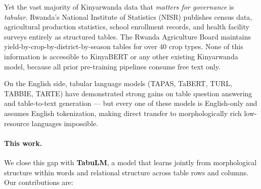 \documentclass[11pt]{article}
\begin{document}
Yet the vast majority of Kinyarwanda data that \emph{matters for governance} is \emph{tabular}.
Rwanda's National Institute of Statistics (NISR) publishes census data, agricultural production statistics, school enrollment records, and health facility surveys entirely as structured tables.
The Rwanda Agriculture Board maintains yield-by-crop-by-district-by-season tables for over 40 crop types.
None of this information is accessible to KinyaBERT or any other existing Kinyarwanda model, because all prior pre-training pipelines consume free text only.

On the English side, tabular language models (TAPAS, TaBERT, TURL, TABBIE, TARTE) have demonstrated strong gains on table question answering and table-to-text generation --- but every one of these models is English-only and assumes English tokenization, making direct transfer to morphologically rich low-resource languages impossible.

\paragraph{This work.}
We close this gap with \textbf{TabuLM}, a model that learns jointly from morphological structure within words and relational structure across table rows and columns.
Our contributions are:
\end{document}
